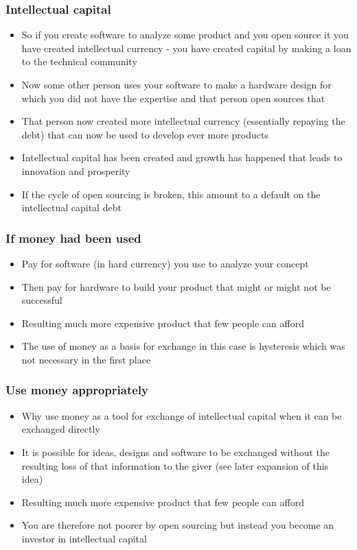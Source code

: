 \documentclass{beamer}
\begin{document}
\begin{frame}
\frametitle{Intellectual capital}

\begin{itemize}
\item So if you create software to analyze some product and you open source it you have created intellectual currency - you have created capital by making a loan to the technical community
\item Now some other person uses your software to make a hardware design for which you did not have the expertise and that person open sources that
\item That person now created more intellectual currency (essentially repaying the debt) that can now be used to develop ever more products
\item Intellectual capital has been created and growth has happened that leads to innovation and prosperity
\item If the cycle of open sourcing is broken, this amount to a default on the intellectual capital debt
\end{itemize}

\end{frame}


\begin{frame}
\frametitle{If money had been used}

\begin{itemize}
\item Pay for software (in hard currency) you use to analyze your concept 
\item Then pay for hardware to build your product that might or might not be successful  
\item Resulting much more expensive product that few people can afford
\item The use of money as a basis for exchange in this case is hysteresis which was not necessary in the first place
\end{itemize}

\end{frame}


\begin{frame}
\frametitle{Use money appropriately}

\begin{itemize}
\item Why use money as a tool for exchange of intellectual capital when it can be exchanged directly
\item It is possible for ideas, designs and software to be exchanged without the resulting loss of that information to the giver (see later expansion of this idea)
\item Resulting much more expensive product that few people can afford
\item You are therefore not poorer by open sourcing but instead you become an investor in intellectual capital
\end{itemize}

\end{frame}
\end{document}
